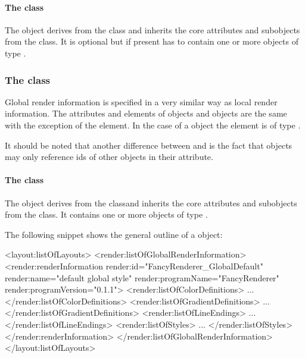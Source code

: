 \paragraph{The  class}
\label{listoflocalstyles-class}

The \ListOfLocalStyles object derives from the  class and inherits
the core attributes and subobjects from the  class. It is optional but 
if present has to contain one or more objects of type \LocalStyle.


\subsubsection{The  class}
\label{globalrenderinformation-class}

Global render information is specified in a very similar way as local render information. The attributes and elements of \GlobalRenderInformation objects and 
\LocalRenderInformation objects are the same with the exception of the  element. In the case of a \GlobalRenderInformation object the  element is of type \ListOfGlobalStyles.

It should be noted that another difference between \GlobalRenderInformation and \LocalRenderInformation is the 
fact that \GlobalRenderInformation objects may only reference ids of other 
\GlobalRenderInformation objects in their  attribute. 

\paragraph{The  class}
\label{listofglobalstyles-class}

The \ListOfGlobalStyles object derives from the  classand inherits
the core attributes and subobjects from the  class. It
contains one or more objects of type \GlobalStyle.

\vspace{0.25cm}
The following snippet shows the general outline of a \ListOfGlobalRenderInformation object:


{\footnotesize
\begin{example}
<layout:listOfLayouts>
   <render:listOfGlobalRenderInformation>
      <render:renderInformation render:id="FancyRenderer_GlobalDefault" 
                         render:name="default global style" 
                         render:programName="FancyRenderer" 
                         render:programVersion="0.1.1">
        <render:listOfColorDefinitions>
             ...
        </render:listOfColorDefinitions>
        <render:listOfGradientDefinitions>
             ...
        </render:listOfGradientDefinitions>
        <render:listOfLineEndings>
             ...
        </render:listOfLineEndings>
        <render:listOfStyles>
             ...
        </render:listOfStyles>
      </render:renderInformation>
   </render:listOfGlobalRenderInformation>
</layout:listOfLayouts>
\end{example}
}
